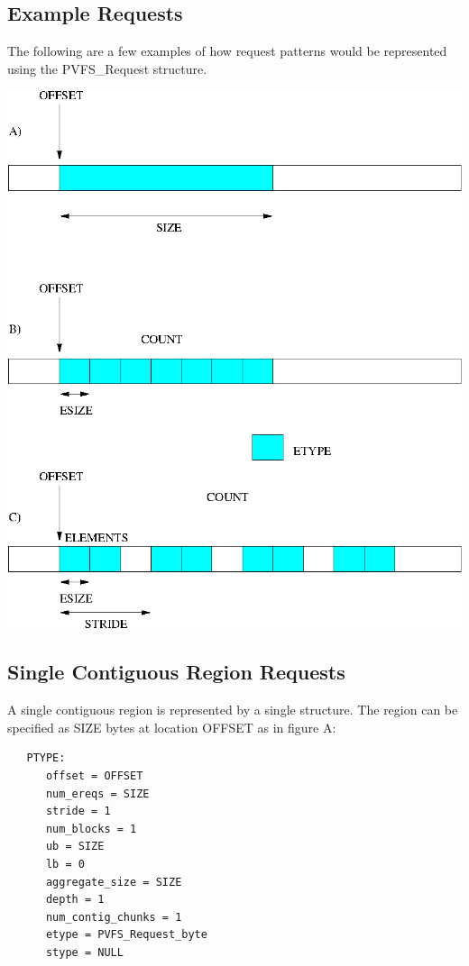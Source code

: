 \documentclass[12pt]{article} %
\begin{document}
\subsection*{Example Requests}

The following are a few examples of how request patterns would be
represented using the PVFS\_Request structure.

\includegraphics[scale=1.0]{figs_atoc.eps}

\subsection*{Single Contiguous Region Requests}

A single contiguous region is represented by a single structure.
The region can be specified as SIZE bytes at location OFFSET as
in figure A:

\begin{verbatim}
   PTYPE:
      offset = OFFSET
      num_ereqs = SIZE
      stride = 1
      num_blocks = 1
      ub = SIZE
      lb = 0
      aggregate_size = SIZE
      depth = 1
      num_contig_chunks = 1
      etype = PVFS_Request_byte
      stype = NULL
\end{verbatim}
\end{document}
